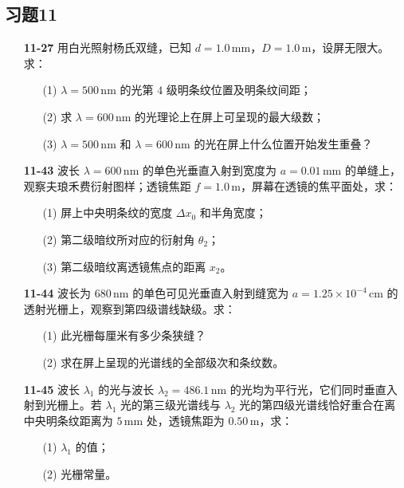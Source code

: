 \newpage

\subsection{习题11}
\begin{enumerate}
	\item [\textbf{11-27}] 用白光照射杨氏双缝，已知 $d=1.0\,\mathrm{mm}$，$D=1.0\,\mathrm{m}$，设屏无限大。求：
	\begin{itemize}
		\item [(1)] $\lambda=500\,\mathrm{nm}$ 的光第 $4$ 级明条纹位置及明条纹间距；
		\item [(2)] 求 $\lambda=600\,\mathrm{nm}$ 的光理论上在屏上可呈现的最大级数；
		\item [(3)] $\lambda=500\,\mathrm{nm}$ 和 $\lambda=600\,\mathrm{nm}$ 的光在屏上什么位置开始发生重叠？
	\end{itemize}
	
	\vspace{0.5em}
	
	\item [\textbf{11-43}] 波长 $\lambda=600\,\mathrm{nm}$ 的单色光垂直入射到宽度为 $a=0.01\,\mathrm{mm}$ 的单缝上，观察夫琅禾费衍射图样；透镜焦距 $f=1.0\,\mathrm{m}$，屏幕在透镜的焦平面处，求：
	\begin{itemize}
		\item [(1)] 屏上中央明条纹的宽度 $\Delta x_0$ 和半角宽度；
		\item [(2)] 第二级暗纹所对应的衍射角 $\theta_2$；
		\item [(3)] 第二级暗纹离透镜焦点的距离 $x_2$。
	\end{itemize}
	
	\vspace{0.5em}
	
	\item [\textbf{11-44}] 波长为 $680\,\mathrm{nm}$ 的单色可见光垂直入射到缝宽为 $a=1.25\times 10^{-4}\,\mathrm{cm}$ 的透射光栅上，观察到第四级谱线缺级。求：
	\begin{itemize}
		\item [(1)] 此光栅每厘米有多少条狭缝？
		\item [(2)] 求在屏上呈现的光谱线的全部级次和条纹数。
	\end{itemize}
	
	\vspace{0.5em}
	
	\item [\textbf{11-45}] 波长 $\lambda_1$ 的光与波长 $\lambda_2=486.1\,\mathrm{nm}$ 的光均为平行光，它们同时垂直入射到光栅上。若 $\lambda_1$ 光的第三级光谱线与 $\lambda_2$ 光的第四级光谱线恰好重合在离中央明条纹距离为 $5\,\mathrm{mm}$ 处，透镜焦距为 $0.50\,\mathrm{m}$，求：
	\begin{itemize}
		\item [(1)] $\lambda_1$ 的值；
		\item [(2)] 光栅常量。
	\end{itemize}
	

\end{enumerate}
